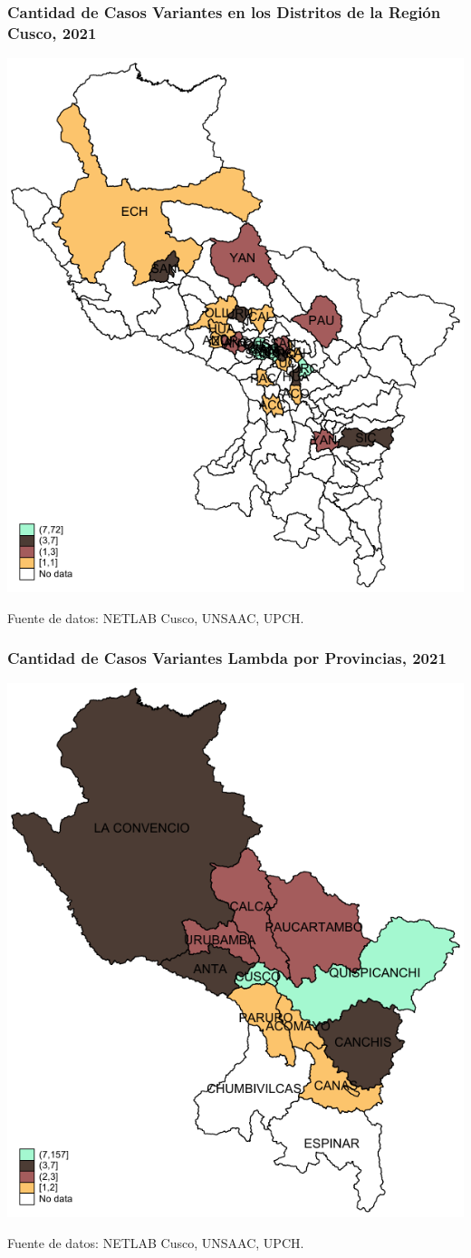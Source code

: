 \documentclass[xcolor=table]{beamer}
\begin{document}
	\begin{frame}[label=mapa_distrital]
	\frametitle{Cantidad de Casos Variantes en los Distritos de la Región Cusco, 2021}
	\begin{center}
		\includegraphics[width=0.55\linewidth]{../figuras/variantes_distrital.pdf}
	\end{center}
	{\tiny Fuente de datos: NETLAB Cusco, UNSAAC, UPCH.}
	
	\hyperlink{mapa_variantes}{}
	\end{frame}

	\begin{frame}[label=mapa_lambda]
		\frametitle{Cantidad de Casos Variantes \textbf{Lambda} por Provincias, 2021}
		\begin{center}
			\includegraphics[width=0.55\linewidth]{../figuras/variantes_provincial_lambda.pdf}
		\end{center}
		{\tiny Fuente de datos: NETLAB Cusco, UNSAAC, UPCH.}
		
		\hyperlink{mapa_variantes}{}
	\end{frame}
\end{document}
